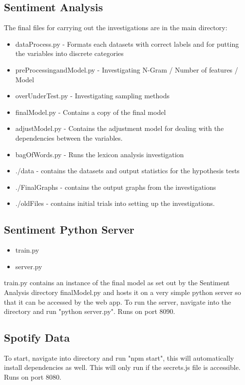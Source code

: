 \begin{appendices}
\subsection{Sentiment Analysis}

The final files for carrying out the investigations are in the main directory:

\begin{itemize}
    \item dataProcess.py - Formats each datasets with correct labels and for putting the variables into discrete categories
    \item preProcessingandModel.py - Investigating N-Gram / Number of features / Model
    \item overUnderTest.py - Investigating sampling methods
    \item finalModel.py - Contains a copy of the final model
    \item adjustModel.py  - Contains the adjustment model for dealing with the dependencies between the variables.
    \item bagOfWords.py - Runs the lexicon analysis investigation
    \item ./data -  contains the datasets and output statistics for the hypothesis tests
    \item ./FinalGraphs -  contains the output graphs from the investigations
    \item ./oldFiles - contains initial trials into setting up the investigations.
\end{itemize}


\subsection{Sentiment Python Server}

\begin{itemize}
    \item train.py
    \item server.py
\end{itemize}
train.py contains an instance of the final model as set out by the Sentiment Analysis directory finalModel.py and  hosts it on a very simple python server so that it can be accessed by the web app. 
To run the server, navigate into the directory and run "python server.py". Runs on port 8090.

\subsection{Spotify Data}
To start, navigate into directory and run "npm start", this will automatically install dependencies as well.  This will only run if the secrets.js file is accessible. Runs on port 8080.


\end{appendices}
